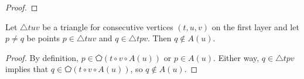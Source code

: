 \documentclass{cccg24}
\newcommand{\lrParents}[1]{\left( #1 \right)}
\newcommand{\Tri}[3]{\triangle #1#2#3}
\newcommand{\poly}[1]{\pentagon\!\lrParents{#1}}
\newenvironment{customlemma}[1]
  {\renewcommand\theinnercustomthm{#1}\innercustomthm}
  {\endinnercustomthm}
\begin{document}
\begin{proof}
    
\end{proof}


\begin{customlemma}{\ref{lem:combined}(2)}
    Let $\Tri{t}{u}{v}$ be a triangle for consecutive vertices $(t,u,v)$ on the first layer and let $p \neq q$ be points $p \in \Tri{t}{u}{v}$ and $q \in \Tri{t}{p}{v}$. Then $q \notin A(u)$.
\end{customlemma}
\begin{proof}
    By definition, $p \in \poly{t \circ v \circ A(u)}$ or $p \in A(u)$. 
    Either way, $q \in \Tri{t}{p}{v}$ implies that $q \in \poly{t \circ v \circ A(u)}$, so $q \not \in A(u)$. 
\end{proof}
\end{document}
